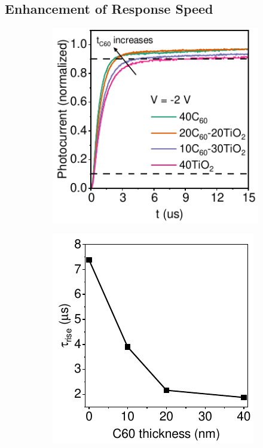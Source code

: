 \subsection{Enhancement of Response Speed}

\begin{figure}[ht!]
    \centering
    \begin{subfigure}[t]{0.4\textwidth}
        \centering
        \includegraphics[width=\textwidth]{chapters/transport_layers/images/TPC_comparison_v2.pdf} %
        \caption{}
        \label{}
    \end{subfigure}
    \hspace{0.5cm}
    \begin{subfigure}[t]{0.37\textwidth}
        \centering
        \includegraphics[width=\textwidth]{chapters/transport_layers/images/Rise_time_f_c60_thickness.pdf} 

\end{subfigure}
\end{figure}
